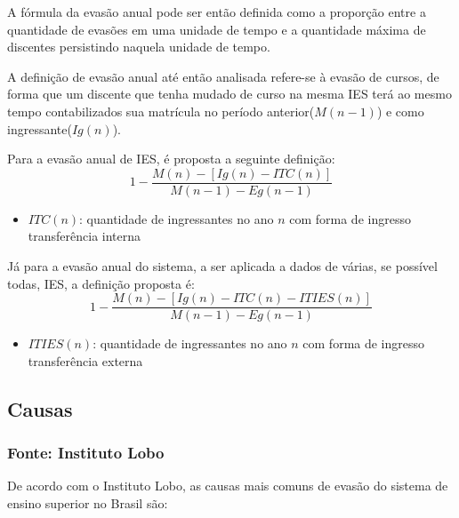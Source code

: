 \documentclass{report}
\begin{document}
A fórmula da evasão anual pode ser então definida como a proporção entre a quantidade de evasões em uma unidade de tempo e a quantidade máxima de discentes persistindo naquela unidade de tempo.

A definição de evasão anual até então analisada refere-se à evasão de cursos, de forma que um discente que tenha mudado de curso na mesma IES terá ao mesmo tempo contabilizados sua matrícula no período anterior($M(n-1)$) e como ingressante($Ig(n)$).

Para a evasão anual de IES, é proposta a seguinte definição:
\begin{equation}
1 - \frac{M(n) - [Ig(n) - ITC(n)]}{M(n-1) - Eg(n-1)}
\end{equation}
\begin{itemize}
\item $ITC(n)$: quantidade de ingressantes no ano $n$ com forma de ingresso transferência interna
\end{itemize}

Já para a evasão anual do sistema, a ser aplicada a dados de várias, se possível todas, IES, a definição proposta é:
\begin{equation}
1 - \frac{M(n) - [Ig(n) - ITC(n) - ITIES(n)]}{M(n-1) - Eg(n-1)}
\end{equation}
\begin{itemize}
\item $ITIES(n)$: quantidade de ingressantes no ano $n$ com forma de ingresso transferência externa
\end{itemize}


\subsection{Causas}

\subsubsection{Fonte: Instituto Lobo}
De acordo com o Instituto Lobo\cite{evasao_panorama2}, as causas mais comuns de evasão do sistema de ensino superior no Brasil são:
\end{document}
